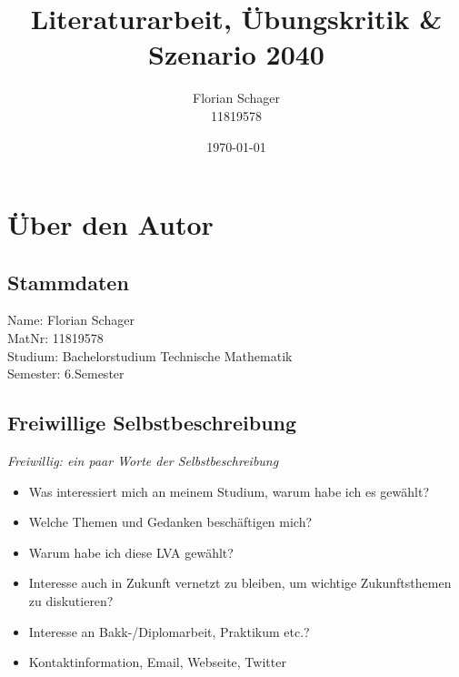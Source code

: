 \documentclass[twoside, a4paper, DIV=11, open=any, bibliography=totoc]{scrbook}
\begin{document}
\begin{titlepage}
    \subject{LVA: "`Technik für Menschen 2040"'}
    \title{Literaturarbeit, Übungskritik \& Szenario 2040}
    \author{
        Florian Schager\\
        \small 11819578
    }
    \date{\today}
    \titlehead{Sommersemester 2021}
\end{titlepage}
\maketitle



\tableofcontents


\chapter{Über den Autor} \label{chap:Autor}

\section{Stammdaten} \label{sec:stammdaten}

Name: Florian Schager\\
MatNr: 11819578\\
Studium: Bachelorstudium Technische Mathematik \\
Semester: 6.Semester \\

\section{Freiwillige Selbstbeschreibung} \label{sec:selbstbeschreibung}

\textit{Freiwillig: ein paar Worte der Selbstbeschreibung}

\begin{itemize}
    \item Was interessiert mich an meinem Studium, warum habe ich es gewählt?
    \item Welche Themen und Gedanken beschäftigen mich?
    \item Warum habe ich diese LVA gewählt?
    \item Interesse auch in Zukunft vernetzt zu bleiben, um wichtige Zukunftsthemen zu diskutieren?
    \item Interesse an Bakk-/Diplomarbeit, Praktikum etc.?
    \item Kontaktinformation, Email, Webseite, Twitter
\end{itemize}
\end{document}
